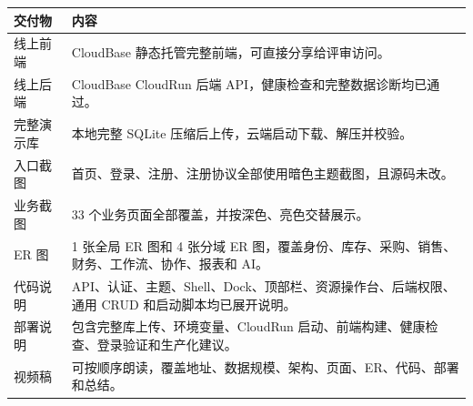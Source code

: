 \documentclass[UTF8,zihao=-4]{ctexart}
\begin{document}
\begin{longtable}{p{}p{}}
\toprule
交付物 & 内容 \\
\midrule
\endhead
线上前端 & CloudBase 静态托管完整前端，可直接分享给评审访问。 \\
线上后端 & CloudBase CloudRun 后端 API，健康检查和完整数据诊断均已通过。 \\
完整演示库 & 本地完整 SQLite 压缩后上传，云端启动下载、解压并校验。 \\
入口截图 & 首页、登录、注册、注册协议全部使用暗色主题截图，且源码未改。 \\
业务截图 & 33 个业务页面全部覆盖，并按深色、亮色交替展示。 \\
ER 图 & 1 张全局 ER 图和 4 张分域 ER 图，覆盖身份、库存、采购、销售、财务、工作流、协作、报表和 AI。 \\
代码说明 & API、认证、主题、Shell、Dock、顶部栏、资源操作台、后端权限、通用 CRUD 和启动脚本均已展开说明。 \\
部署说明 & 包含完整库上传、环境变量、CloudRun 启动、前端构建、健康检查、登录验证和生产化建议。 \\
视频稿 & 可按顺序朗读，覆盖地址、数据规模、架构、页面、ER、代码、部署和总结。 \\
\bottomrule
\end{longtable}
\end{document}
